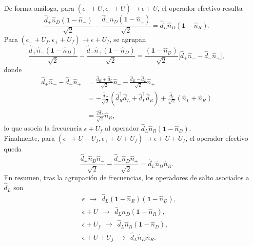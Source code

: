 \begin{appendixs}
De forma análoga, para \((\epsilon_{-}+U,\epsilon_{+}+U)\to \epsilon+U\), el operador efectivo resulta
\[
\frac{\hat{d}_{+}\hat{n}_{D}(\mathbf{1}-\hat{n}_{-})}{\sqrt{2}}
-\frac{\hat{d}_{-}\hat{n}_{D}(\mathbf{1}-\hat{n}_{+})}{\sqrt{2}}
=\hat{d}_{L}\hat{n}_{D}(\mathbf{1}-\hat{n}_{R}).
\]
Para \((\epsilon_{-}+U_{f},\epsilon_{+}+U_{f})\to \epsilon+U_{f}\), se agrupan
\[
\frac{\hat{d}_{+}\hat{n}_{-}(\mathbf{1}-\hat{n}_{D})}{\sqrt{2}}
-\frac{\hat{d}_{-}\hat{n}_{+}(\mathbf{1}-\hat{n}_{D})}{\sqrt{2}}
=\frac{(\mathbf{1}-\hat{n}_{D})}{\sqrt{2}}\big[\hat{d}_{+}\hat{n}_{-}-\hat{d}_{-}\hat{n}_{+}\big],
\]
donde
\begin{align*}
\hat{d}_{+}\hat{n}_{-}-\hat{d}_{-}\hat{n}_{+}
&=\frac{\hat{d}_{R}+\hat{d}_{L}}{\sqrt{2}}\hat{n}_{-}
-\frac{\hat{d}_{R}-\hat{d}_{L}}{\sqrt{2}}\hat{n}_{+}\\
&=-\frac{\hat{d}_{R}}{\sqrt{2}}(\hat{d}^{\dagger}_{R}\hat{d}_{L}+\hat{d}^{\dagger}_{L}\hat{d}_{R})
+\frac{\hat{d}_{L}}{\sqrt{2}}(\hat{n}_{L}+\hat{n}_{R})\\
&=\frac{2\hat{d}_{L}}{\sqrt{2}}\hat{n}_{R},
\end{align*}
lo que asocia la frecuencia \(\epsilon+U_{f}\) al operador
\(\hat{d}_{L}\hat{n}_{R}(\mathbf{1}-\hat{n}_{D})\).
\\

Finalmente, para \((\epsilon_{-}+U+U_{f},\epsilon_{+}+U+U_{f})\to \epsilon+U+U_{f}\), el operador efectivo queda
\[
\frac{\hat{d}_{+}\hat{n}_{D}\hat{n}_{-}}{\sqrt{2}}
-\frac{\hat{d}_{-}\hat{n}_{D}\hat{n}_{+}}{\sqrt{2}}
=\hat{d}_{L}\hat{n}_{D}\hat{n}_{R}.
\]
En resumen, tras la agrupación de frecuencias, los operadores de salto asociados a \(\hat{d}_{L}\) son
\begin{align*}
&\epsilon \ \ \to\ \ \hat{d}_{L}(\mathbf{1}-\hat{n}_{R})(\mathbf{1}-\hat{n}_{D}),\\
&\epsilon+U \ \ \to\ \ \hat{d}_{L}\hat{n}_{D}(\mathbf{1}-\hat{n}_{R}),\\
&\epsilon+U_{f} \ \ \to\ \ \hat{d}_{L}\hat{n}_{R}(\mathbf{1}-\hat{n}_{D}),\\
&\epsilon+U+U_{f} \ \ \to\ \ \hat{d}_{L}\hat{n}_{D}\hat{n}_{R}.
\end{align*}


\end{appendixs}
